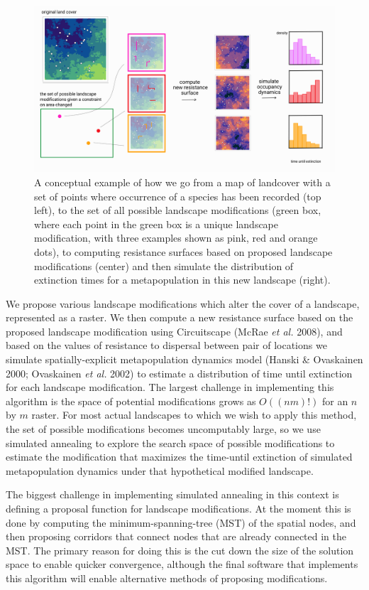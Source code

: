 \documentclass[10pt,oneside]{article}
\makeatletter
\def\maxwidth{\ifdim\Gin@nat@width>\linewidth\linewidth
\else\Gin@nat@width\fi}
\let\Oldincludegraphics\includegraphics
\renewcommand{\includegraphics}[1]{\Oldincludegraphics[width=\maxwidth]{#1}}
\makeatother
\begin{document}
\begin{figure}
\hypertarget{fig:ch3}{%
\centering
\includegraphics{./figures/ch3.png}
\caption{A conceptual example of how we go from a map of landcover with
a set of points where occurrence of a species has been recorded (top
left), to the set of all possible landscape modifications (green box,
where each point in the green box is a unique landscape modification,
with three examples shown as pink, red and orange dots), to computing
resistance surfaces based on proposed landscape modifications (center)
and then simulate the distribution of extinction times for a
metapopulation in this new landscape (right).}\label{fig:ch3}
}
\end{figure}

We propose various landscape modifications which alter the cover of a
landscape, represented as a raster. We then compute a new resistance
surface based on the proposed landscape modification using Circuitscape
(McRae \emph{et al.} 2008), and based on the values of resistance to
dispersal between pair of locations we simulate spatially-explicit
metapopulation dynamics model (Hanski \& Ovaskainen 2000; Ovaskainen
\emph{et al.} 2002) to estimate a distribution of time until extinction
for each landscape modification. The largest challenge in implementing
this algorithm is the space of potential modifications grows as
\(O((nm)!)\) for an \(n\) by \(m\) raster. For most actual landscapes to
which we wish to apply this method, the set of possible modifications
becomes uncomputably large, so we use simulated annealing to explore the
search space of possible modifications to estimate the modification that
maximizes the time-until extinction of simulated metapopulation dynamics
under that hypothetical modified landscape.

The biggest challenge in implementing simulated annealing in this
context is defining a proposal function for landscape modifications. At
the moment this is done by computing the minimum-spanning-tree (MST) of
the spatial nodes, and then proposing corridors that connect nodes that
are already connected in the MST. The primary reason for doing this is
the cut down the size of the solution space to enable quicker
convergence, although the final software that implements this algorithm
will enable alternative methods of proposing modifications.
\end{document}

